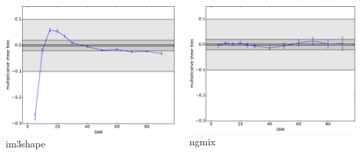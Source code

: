 \documentclass{beamer}
\begin{document}
{    \begin{columns}
        \begin{column}{0.5\textwidth}
            \begin{center}
                \includegraphics[width=\textwidth]{greatdes-im3shape.pdf}
                \newline
                {\tiny im3shape}
            \end{center}
        \end{column}
        \begin{column}{0.5\textwidth}
            \begin{center}
                \includegraphics[width=\textwidth]{greatdes-ngmix.pdf}
                \newline
                {\tiny ngmix}
            \end{center}
        \end{column}
    \end{columns}

}
\end{document}
